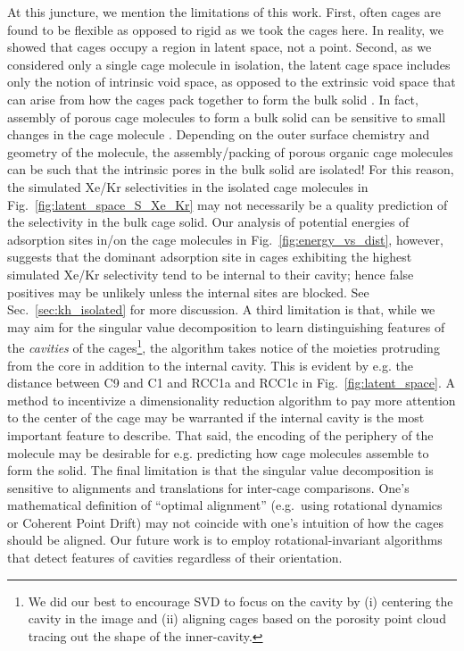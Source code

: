 \documentclass[journal=jacsat,manuscript=article,layout=traditional]{achemso}
\begin{document}
At this juncture, we mention the limitations of this work. First, often cages are found to be flexible \cite{chen2014separation,camp2016transition,holden2014gas,holden2016understanding} as opposed to rigid as we took the cages here. {\color{red} In reality, we showed that cages occupy a region in latent space, not a point.} Second, as we considered only a single cage molecule in isolation, the latent cage space includes only the notion of intrinsic void space, as opposed to the extrinsic void space that can arise from how the cages pack together to form the bulk solid \cite{hasell2016porous}. In fact, assembly of porous cage molecules to form a bulk solid can be sensitive to small changes in the cage molecule \cite{hasell2014controlling}. Depending on the outer surface chemistry and geometry of the molecule, the assembly/packing of porous organic cage molecules can be such that the intrinsic pores in the bulk solid are isolated!\cite{tozawa2009porous} {\color{red} For this reason, the simulated Xe/Kr selectivities in the isolated cage molecules in Fig.~\ref{fig:latent_space_S_Xe_Kr} may not necessarily be a quality prediction of the selectivity in the bulk cage solid. Our analysis of potential energies of adsorption sites in/on the cage molecules in Fig.~\ref{fig:energy_vs_dist}, however, suggests that the dominant adsorption site in cages exhibiting the highest simulated Xe/Kr selectivity tend to be internal to their cavity; hence false positives may be unlikely unless the internal sites are blocked. See Sec.~\ref{sec:kh_isolated} for more discussion.} A third limitation is that, while we may aim for the singular value decomposition to learn distinguishing features of the \emph{cavities} of the cages\footnote{\color{red} We did our best to encourage SVD to focus on the cavity by (i) centering the cavity in the image and (ii) aligning cages based on the porosity point cloud tracing out the shape of the inner-cavity.}, the algorithm takes notice of the moieties protruding from the core in addition to the internal cavity. {\color{red} This is evident by e.g. the distance between C9 and C1 and RCC1a and RCC1c in Fig.~\ref{fig:latent_space}.} A method to incentivize a dimensionality reduction algorithm to pay more attention to the center of the cage may be warranted if the internal cavity is the most important feature to describe. That said, the encoding of the periphery of the molecule may be desirable for e.g. predicting how cage molecules assemble to form the solid. The final limitation is that the singular value decomposition is sensitive to alignments and translations for inter-cage comparisons. {\color{red} One's mathematical definition of ``optimal alignment'' (e.g.\ using rotational dynamics or Coherent Point Drift) may not coincide with one's intuition of how the cages should be aligned. Our future work is to employ rotational-invariant algorithms that detect features of cavities regardless of their orientation.}
\end{document}
